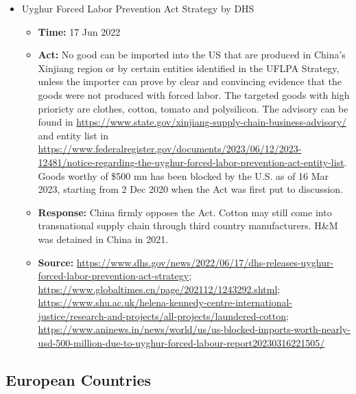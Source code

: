 \begin{itemize}
			\item Uyghur Forced Labor Prevention Act Strategy by DHS
				\begin{itemize}
				\item \textbf{Time: } 17 Jun 2022
				\item \textbf{Act: } No good can be imported into the US that are produced in China’s Xinjiang region or by certain entities identified in the UFLPA Strategy, unless the importer can prove by clear and convincing evidence that the goods were not produced with forced labor. The targeted goods with high prioricty are clothes, cotton, tomato and polysilicon. The advisory can be found in \url{https://www.state.gov/xinjiang-supply-chain-business-advisory/} and entity list in \url{https://www.federalregister.gov/documents/2023/06/12/2023-12481/notice-regarding-the-uyghur-forced-labor-prevention-act-entity-list}. Goods worthy of \$500 mn has been blocked by the U.S. as of 16 Mar 2023, starting from 2 Dec 2020 when the Act was first put to discussion.
				\item \textbf{Response: }China firmly opposes the Act. Cotton may still come into transnational supply chain through third country manufacturers. H\&M was detained in China in 2021.
				\item	\textbf{Source: } \url{https://www.dhs.gov/news/2022/06/17/dhs-releases-uyghur-forced-labor-prevention-act-strategy}; \url{https://www.globaltimes.cn/page/202112/1243292.shtml}; \url{https://www.shu.ac.uk/helena-kennedy-centre-international-justice/research-and-projects/all-projects/laundered-cotton}; \url{https://www.aninews.in/news/world/us/us-blocked-imports-worth-nearly-usd-500-million-due-to-uyghur-forced-labour-report20230316221505/}
				\end{itemize}

			\end{itemize}
			
	\subsection{European Countries}
